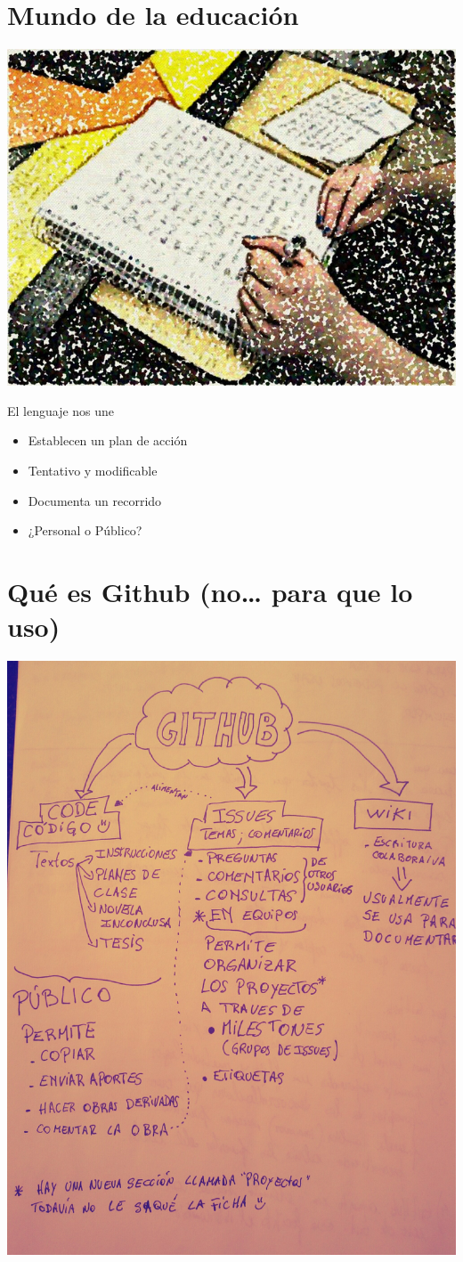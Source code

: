 \documentclass[11pt]{article}
\begin{document}
\section{Mundo de la educación}
\label{sec:orgheadline3}
\includegraphics[width=.9\linewidth]{pictures/escribir.jpg}


El lenguaje nos une

\begin{itemize}
\item Establecen un plan de acción
\item Tentativo y modificable
\item Documenta un recorrido
\item ¿Personal o Público?
\end{itemize}

\section{Qué es Github (no\ldots{} para que lo uso)}
\label{sec:orgheadline4}
\includegraphics[width=.9\linewidth]{pictures/queesgithub.jpg}
\end{document}
